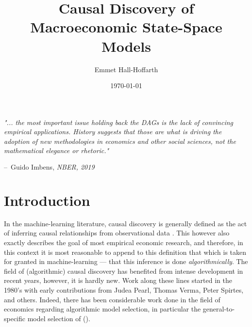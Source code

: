 \documentclass{article}
\title{Causal Discovery of Macroeconomic State-Space Models}
\author{Emmet Hall-Hoffarth}
\date{\today}
\makeatletter
\newenvironment{chapquote}[2][2em]
  {\setlength{\@tempdima}{#1}%
   \def\chapquote@author{#2}%
   \parshape 1 \@tempdima \dimexpr\textwidth-2\@tempdima\relax%
   \itshape}
  {\par\normalfont\hfill--\ \chapquote@author\hspace*{\@tempdima}\par\bigskip}
\makeatother
\begin{document}
\maketitle


\vspace{1cm}

\begin{chapquote}{Guido Imbens, \textit{NBER, 2019}}
  "... the most important issue holding back the DAGs is the lack of convincing empirical applications. History suggests that those are what is driving the adoption of new methodologies in economics and other social sciences,  not the mathematical elegance or rhetoric."
\end{chapquote}

\section{Introduction}

In the machine-learning literature, causal discovery is generally defined as the act of inferring causal relationships from observational data \parencite{huang2020causal}. This however also exactly describes the goal of most empirical economic research, and therefore, in this context it is most reasonable to append to this definition that which is taken for granted in machine-learning --- that this inference is done \textit{algorithmically}. The field of (algorithmic) causal discovery has benefited from intense development in recent years, however, it is hardly new. Work along these lines started in the 1980's with early contributions from Judea Pearl, Thomas Verma, Peter Spirtes, and others. Indeed, there has been considerable work done in the field of economics regarding algorithmic model selection, in particular the general-to-specific model selection of \citeauthor{krolzig2001computer} (\citeyear{krolzig2001computer}).
\end{document}
